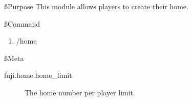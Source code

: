 
\ss{Purpose}
This module allows players to create their home.

\ss{Command}
\begin{enumerate}
    \item /home
\end{enumerate}

\ss{Meta}
\begin{description}
    \item [fuji.home.home\_limit] The home number per player limit.
\end{description}

